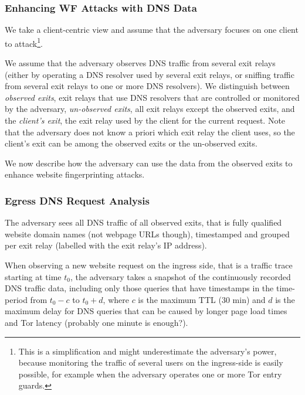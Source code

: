 \subsubsection{Enhancing WF Attacks with DNS Data}

We take a client-centric view and assume that the adversary focuses on
one client to attack\footnote{This is a simplification and might underestimate
the adversary's power, because monitoring the traffic of several users
on the ingress-side is easily possible, for example when the adversary
operates one or more Tor entry guards.}.

We assume that the adversary observes DNS traffic from several exit
relays (either by operating a DNS resolver used by several exit relays,
or sniffing traffic from several exit relays to one or more DNS
resolvers).
%
We distinguish between \emph{observed exits}, \ie exit relays that use
DNS resolvers that are controlled or monitored by the adversary,
\emph{un-observed exits}, \ie all exit relays except the observed
exits, and the \emph{client's exit}, \ie the exit relay used by the
client for the current request.
%
Note that the adversary does not know a priori which exit relay the
client uses, so the client's exit can be among the observed exits or the
un-observed exits.

%
We now describe how the adversary can use the data from the observed
exits to enhance website fingerprinting attacks.


\subsubsection{Egress DNS Request Analysis}

The adversary sees all DNS traffic of all observed exits, that is fully
qualified website domain names (not webpage URLs though), timestamped
and grouped per exit relay (\eg labelled with the exit relay's IP
address).

When observing a new website request on the ingress side, that is a
traffic trace starting at time $t_0$, the adversary takes a snapshot
of the continuously recorded DNS traffic data, including only those queries
that have timestamps in the time-period from $t_0 - c$ to $t_0 + d$,
where $c$ is the maximum TTL (30 min) and $d$ is the maximum delay
for DNS queries that can be caused by longer page load times and Tor
latency (probably one minute is enough?).


